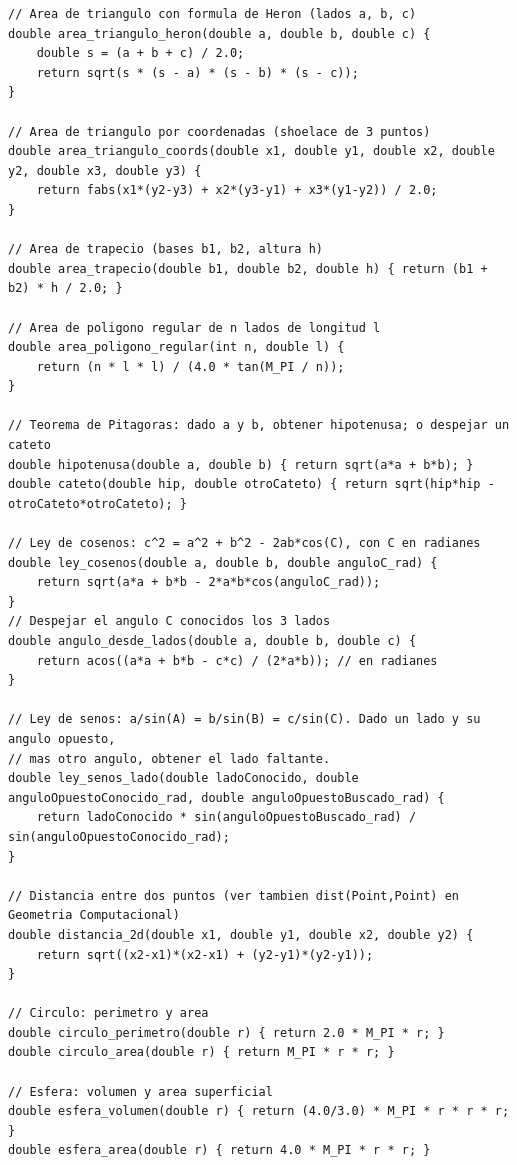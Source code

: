 \documentclass[10pt,twocolumn,letterpaper]{report}
\begin{document}
\begin{lstlisting}
// Area de triangulo con formula de Heron (lados a, b, c)
double area_triangulo_heron(double a, double b, double c) {
    double s = (a + b + c) / 2.0;
    return sqrt(s * (s - a) * (s - b) * (s - c));
}

// Area de triangulo por coordenadas (shoelace de 3 puntos)
double area_triangulo_coords(double x1, double y1, double x2, double y2, double x3, double y3) {
    return fabs(x1*(y2-y3) + x2*(y3-y1) + x3*(y1-y2)) / 2.0;
}

// Area de trapecio (bases b1, b2, altura h)
double area_trapecio(double b1, double b2, double h) { return (b1 + b2) * h / 2.0; }

// Area de poligono regular de n lados de longitud l
double area_poligono_regular(int n, double l) {
    return (n * l * l) / (4.0 * tan(M_PI / n));
}

// Teorema de Pitagoras: dado a y b, obtener hipotenusa; o despejar un cateto
double hipotenusa(double a, double b) { return sqrt(a*a + b*b); }
double cateto(double hip, double otroCateto) { return sqrt(hip*hip - otroCateto*otroCateto); }

// Ley de cosenos: c^2 = a^2 + b^2 - 2ab*cos(C), con C en radianes
double ley_cosenos(double a, double b, double anguloC_rad) {
    return sqrt(a*a + b*b - 2*a*b*cos(anguloC_rad));
}
// Despejar el angulo C conocidos los 3 lados
double angulo_desde_lados(double a, double b, double c) {
    return acos((a*a + b*b - c*c) / (2*a*b)); // en radianes
}

// Ley de senos: a/sin(A) = b/sin(B) = c/sin(C). Dado un lado y su angulo opuesto,
// mas otro angulo, obtener el lado faltante.
double ley_senos_lado(double ladoConocido, double anguloOpuestoConocido_rad, double anguloOpuestoBuscado_rad) {
    return ladoConocido * sin(anguloOpuestoBuscado_rad) / sin(anguloOpuestoConocido_rad);
}

// Distancia entre dos puntos (ver tambien dist(Point,Point) en Geometria Computacional)
double distancia_2d(double x1, double y1, double x2, double y2) {
    return sqrt((x2-x1)*(x2-x1) + (y2-y1)*(y2-y1));
}

// Circulo: perimetro y area
double circulo_perimetro(double r) { return 2.0 * M_PI * r; }
double circulo_area(double r) { return M_PI * r * r; }

// Esfera: volumen y area superficial
double esfera_volumen(double r) { return (4.0/3.0) * M_PI * r * r * r; }
double esfera_area(double r) { return 4.0 * M_PI * r * r; }


\end{lstlisting}
\end{document}
